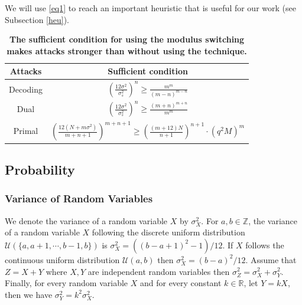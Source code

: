 \documentclass{cta-author}
\begin{document}
We will use \eqref{eq1} to reach an important heuristic that is useful for our work (see Subsection \ref{heu}).





\begin{table}[t] 
	\small\addtolength{\tabcolsep}{-4.5pt}
	\centering
	
	\caption{\textbf{The sufficient condition for using the modulus switching}\\ \textbf{makes attacks stronger than without using the technique.} } 
	
	\begin{tabular}{ c | c  }
		\hline
		\textbf{Attacks}& \textbf{Sufficient condition}\\
		\hline\hline
		\multirow{2}{*}{Decoding }&\multirow{2}{*}{$ \left(\frac{12\sigma^2}{\sigma_s^2}\right)^{n} \geq\frac{m^m}{(m-n)^{m-n}}$}\\
		&\\
		
		\hline
		
		\multirow{2}{*}{Dual}&\multirow{2}{*}{$\left(\frac{12\sigma^2}{\sigma_s^2}\right)^{n} \geq\frac{(m+n)^{m+n}}{m^{m}}$}\\
		&\\
		
		\hline
		\multirow{2}{*}{Primal}  &\multirow{2}{*}{$ 
			\left(\frac{12(N+m\sigma^2)}{m+n+1}\right)^{m+n+1} \geq \left( \frac{(m+12)N}{n+1}\right)^{n+1} \cdot \left( q^{2} M \right)^{m} $}\\
		&\\
		
		\hline
		
		
	\end{tabular}\label{tab3}
	
\end{table}





\subsection{Probability} \label{prob}

\subsubsection{Variance of Random Variables} \label{ran}
We denote the variance of a random variable $X$ by $\sigma_X^2$.
For $a, b \in \mathbb{Z}$, the variance of a random variable $X$ following the discrete uniform distribution $\mathcal{U}(\{a, a+1,\cdots, b-1,b\})$ is 
$\sigma_{X}^2=((b-a+1)^2-1)/12$. 
If $X$ follows the continuous uniform distribution $\mathcal{U}(a,b)$ then
$\sigma_{X}^2=(b-a)^2/12.$ Assume that $Z=X+Y$ where $X,Y $ are independent random variables then $\sigma^2_Z=\sigma^2_X+\sigma^2_Y.$ Finally, for every random variable $X$ and for every constant $k\in \mathbb{R}$, let $Y=kX$, then we have
$\sigma^2_Y=k^2\sigma^2_{X}$.
\end{document}
